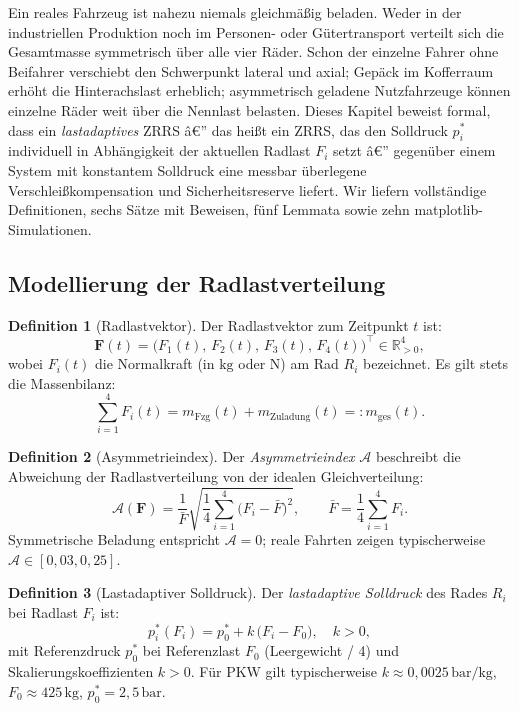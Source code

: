 ﻿\documentclass[a4paper,12pt]{article}
\theoremstyle{definition}
\newtheorem{definition}{Definition}
\begin{document}
Ein reales Fahrzeug ist nahezu niemals gleichmäßig beladen. Weder in der
industriellen Produktion noch im Personen- oder Gütertransport verteilt sich
die Gesamtmasse symmetrisch über alle vier Räder. Schon der einzelne Fahrer
ohne Beifahrer verschiebt den Schwerpunkt lateral und axial; Gepäck im
Kofferraum erhöht die Hinterachslast erheblich; asymmetrisch geladene
Nutzfahrzeuge können einzelne Räder weit über die Nennlast belasten. Dieses
Kapitel beweist formal, dass ein \emph{lastadaptives} ZRRS â€” das heißt ein
ZRRS, das den Solldruck $p^*_i$ individuell in Abhängigkeit der aktuellen
Radlast $F_i$ setzt â€” gegenüber einem System mit konstantem Solldruck eine
messbar überlegene Verschleißkompensation und Sicherheitsreserve liefert.
Wir liefern vollständige Definitionen, sechs Sätze mit Beweisen, fünf Lemmata
sowie zehn matplotlib-Simulationen.

\subsection{Modellierung der Radlastverteilung}

\begin{definition}[Radlastvektor]
Der Radlastvektor zum Zeitpunkt $t$ ist:
\[
    \mathbf{F}(t) = \bigl(F_1(t),\, F_2(t),\, F_3(t),\, F_4(t)\bigr)^{\top}
    \in \mathbb{R}_{>0}^4,
\]
wobei $F_i(t)$ die Normalkraft (in $\text{kg}$ oder $\text{N}$) am Rad $R_i$
bezeichnet. Es gilt stets die Massenbilanz:
\[
    \sum_{i=1}^{4} F_i(t) = m_{\text{Fzg}}(t) + m_{\text{Zuladung}}(t)
    =: m_{\text{ges}}(t).
\]
\end{definition}

\begin{definition}[Asymmetrieindex]
\label{def:asymm}
Der \emph{Asymmetrieindex} $\mathcal{A}$ beschreibt die Abweichung der
Radlastverteilung von der idealen Gleichverteilung:
\[
    \mathcal{A}(\mathbf{F}) = \frac{1}{\bar{F}}
    \sqrt{\frac{1}{4}\sum_{i=1}^{4}\bigl(F_i - \bar{F}\bigr)^2},
    \qquad \bar{F} = \frac{1}{4}\sum_{i=1}^{4} F_i.
\]
Symmetrische Beladung entspricht $\mathcal{A} = 0$; reale Fahrten zeigen
typischerweise $\mathcal{A} \in [0{,}03, 0{,}25]$.
\end{definition}

\begin{definition}[Lastadaptiver Solldruck]
\label{def:lastadapt}
Der \emph{lastadaptive Solldruck} des Rades $R_i$ bei Radlast $F_i$ ist:
\[
    p^*_i(F_i) = p^*_0 + k\,\bigl(F_i - F_0\bigr),
    \quad k > 0,
\]
mit Referenzdruck $p^*_0$ bei Referenzlast $F_0$ (Leergewicht / 4) und
Skalierungskoeffizienten $k > 0$. Für PKW gilt typischerweise
$k \approx 0{,}0025\,\text{bar/kg}$, $F_0 \approx 425\,\text{kg}$,
$p^*_0 = 2{,}5\,\text{bar}$.
\end{definition}
\end{document}
